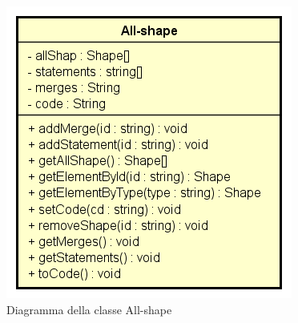 \begin{figure}[h!]
	\centering
	\includegraphics[scale=0.8]{res/sections/SpecificaFrontEnd/Services/Disegnetti/all-shape.png}
	\caption{Diagramma della classe All-shape}
\end{figure}

